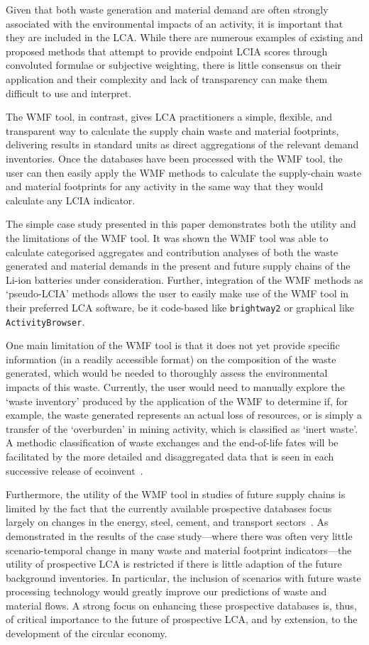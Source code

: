 Given that both waste generation and material demand are often strongly associated with the environmental impacts of an activity, it is important that they are included in the LCA. While there are numerous examples of existing and proposed methods that attempt to provide endpoint LCIA scores through convoluted formulae or subjective weighting, there is little consensus on their application and their complexity and lack of transparency can make them difficult to use and interpret.

The WMF tool, in contrast, gives LCA practitioners a simple, flexible, and transparent way to calculate the supply chain waste and material footprints, delivering results in standard units as direct aggregations of the relevant demand inventories. Once the databases have been processed with the WMF tool, the user can then easily apply the WMF methods to calculate the supply-chain waste and material footprints for any activity in the same way that they would calculate any LCIA indicator.

The simple case study presented in this paper demonstrates both the utility and the limitations of the WMF tool. It was shown the WMF tool was able to calculate categorised aggregates and contribution analyses of both the waste generated and material demands in the present and future supply chains of the Li-ion batteries under consideration. Further, integration of the WMF methods as `pseudo-LCIA' methods allows the user to easily make use of the WMF tool in their preferred LCA software, be it code-based like \texttt{brightway2} or graphical like \texttt{ActivityBrowser}.

One main limitation of the WMF tool is that it does not yet provide specific information (in a readily accessible format) on the composition of the waste generated, which would be needed to thoroughly assess the environmental impacts of this waste. Currently, the user would need to manually explore the `waste inventory' produced by the application of the WMF to determine if, for example, the waste generated represents an actual loss of resources, or is simply a transfer of the `overburden' in mining activity, which is classified as `inert waste'. A methodic classification of waste exchanges and the end-of-life fates will be facilitated by the more detailed and disaggregated data that is seen in each successive release of ecoinvent~\citep{fitzgerald2023ecoinventdocumentation}.

Furthermore, the utility of the WMF tool in studies of future supply chains is limited by the fact that the currently available prospective databases focus largely on changes in the energy, steel, cement, and transport sectors~\citep{sacchi2023premisedocs}. As demonstrated in the results of the case study---where there was often very little scenario-temporal change in many waste and material footprint indicators---the utility of prospective LCA is restricted if there is little adaption of the future background inventories. In particular, the inclusion of scenarios with future waste processing technology would greatly improve our predictions of waste and material flows. A strong focus on enhancing these prospective databases is, thus, of critical importance to the future of prospective LCA, and by extension, to the development of the circular economy. 
